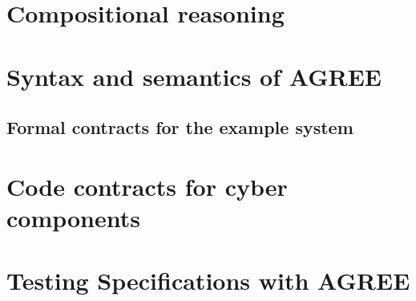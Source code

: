 \documentclass[global,twocolumn]{svjour}
\newif\ifREVISIONS
\begin{document}
\section{Compositional reasoning}
\label{sec:agree}


\ifREVISIONS
\subsection{Revisions}
\begin{compactitem}
  \item \sout{Add in the AGREE specification for the system}
  \item \sout{Add in the AGREE verification conditions (e.g., similar to those in the Scheduled Components NFM submission)}
  \item Add reference to the Liskov principle of safe-substitution when stating that the system contract is a sound abstraction of the implementation.
  \item Add back in a few sentences on the contract for the filter since those have been removed with the addition of the formal definitions.
\end{compactitem}
\fi

\section{Syntax and semantics of AGREE}
\label{agree-semantics}


\subsection{Formal contracts for the example system}


\section{Code contracts for cyber components}
\label{code-contracts}


\section{Testing Specifications with AGREE}
\label{sec:testing}


\end{document}
